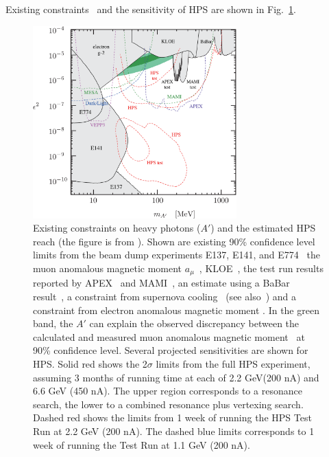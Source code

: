 Existing constraints~\cite{endo:g2e} and the sensitivity of HPS are 
shown in Fig.~\ref{fig:hspaw-heavy-A'}. 

\begin{figure}[h]
\centering
\includegraphics[width=0.7\textwidth]{limit_g-2_electron.pdf} 
\caption{
Existing constraints on heavy photons ($A'$) and the estimated HPS reach (the figure is from \cite{endo:g2e}). 
Shown are existing 90\% confidence level limits from the beam dump experiments 
E137, E141, and E774~\cite{Bjorken:2009mm,Bjorken:1988as,Riordan:1987aw,Bross:1989mp} 
the muon anomalous magnetic moment $a_\mu$~\cite{Pospelov:2008zw},  
KLOE~\cite{Collaboration:2011zc}, 
the test run results reported by APEX~\cite{Abrahamyan:2011gv} and MAMI~\cite{Merkel:2011ze}, 
an estimate using a BaBar result~\cite{Bjorken:2009mm,Reece:2009un,Aubert:2009cp},
a constraint from supernova cooling~\cite{Bjorken:2009mm} (see also~\cite{Dent:2012mx}) and a constraint from electron anomalous magnetic moment \cite{endo:g2e}.
In the green band, the $A'$ can explain the observed discrepancy between the
calculated and measured muon anomalous magnetic moment~\cite{Pospelov:2008zw} 
at 90\% confidence level.
Several projected sensitivities are shown for HPS. Solid red shows the 2$\sigma$ limits from the full HPS experiment, assuming 3 months of running time at each of 2.2 GeV(200 nA) and 6.6 GeV (450 nA). The upper region corresponds to a resonance search, the lower to a combined resonance plus vertexing search. Dashed red shows the limits from 1 week of running the HPS Test Run at 2.2 GeV (200 nA). The dashed blue limits corresponds to 1 week of running the Test Run at 1.1 GeV (200 nA).  
}
\label{fig:hspaw-heavy-A'}
\end{figure}


